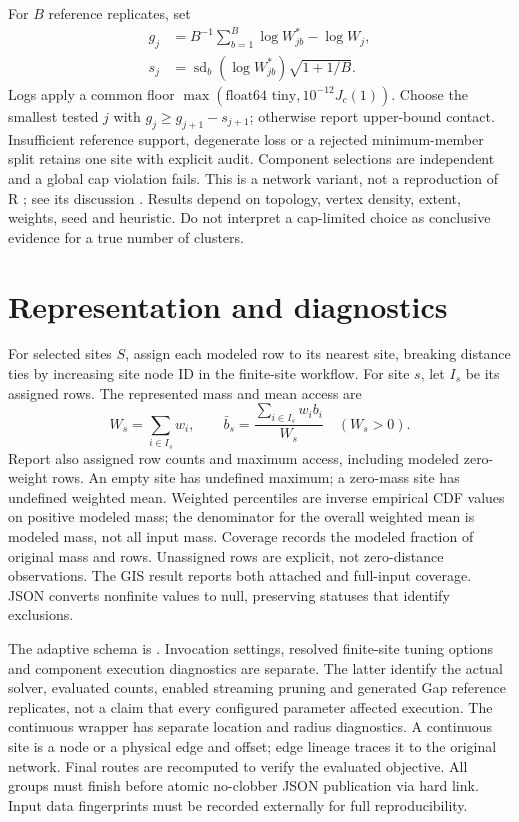 \documentclass[11pt,a4paper]{article}
\newcommand{\code}[1]{\texttt{\detokenize{#1}}}
\begin{document}
For $B$ reference replicates, set
\begin{align*}
 g_j&=B^{-1}\sum_{b=1}^{B}\log W^*_{jb}-\log W_j,\\
 s_j&=\operatorname{sd}_b(\log W^*_{jb})\sqrt{1+1/B}.
\end{align*}
Logs apply a common floor $\max(\text{float64 tiny},10^{-12}J_c(1))$. Choose the smallest tested $j$ with $g_j\ge g_{j+1}-s_{j+1}$; otherwise report upper-bound contact. Insufficient reference support, degenerate loss or a rejected minimum-member split retains one site with explicit audit. Component selections are independent and a global cap violation fails. This is a network variant, not a reproduction of R \code{clusGap}; see its \code{d.power} discussion \cite{clusgap}. Results depend on topology, vertex density, extent, weights, seed and heuristic. Do not interpret a cap-limited choice as conclusive evidence for a true number of clusters.
\section{Representation and diagnostics}
For selected sites $S$, assign each modeled row to its nearest site, breaking distance ties by increasing site node ID in the finite-site workflow. For site $s$, let $I_s$ be its assigned rows. The represented mass and mean access are
\[
 W_s=\sum_{i\in I_s} w_i,\qquad
 \bar b_s=\frac{\sum_{i\in I_s}w_i b_i}{W_s}\quad(W_s>0).
\]
Report also assigned row counts and maximum access, including modeled zero-weight rows. An empty site has undefined maximum; a zero-mass site has undefined weighted mean. Weighted percentiles are inverse empirical CDF values on positive modeled mass; the denominator for the overall weighted mean is modeled mass, not all input mass. Coverage records the modeled fraction of original mass and rows. Unassigned rows are explicit, not zero-distance observations. The GIS result reports both attached and full-input coverage. JSON converts nonfinite values to null, preserving statuses that identify exclusions.

The adaptive schema is \code{net-center-adaptive/5}. Invocation settings, resolved finite-site tuning options and component execution diagnostics are separate. The latter identify the actual solver, evaluated counts, enabled streaming pruning and generated Gap reference replicates, not a claim that every configured parameter affected execution. The continuous wrapper has separate location and radius diagnostics. A continuous site is a node or a physical edge and offset; edge lineage traces it to the original network. Final routes are recomputed to verify the evaluated objective. All groups must finish before atomic no-clobber JSON publication via hard link. Input data fingerprints must be recorded externally for full reproducibility.
\end{document}
